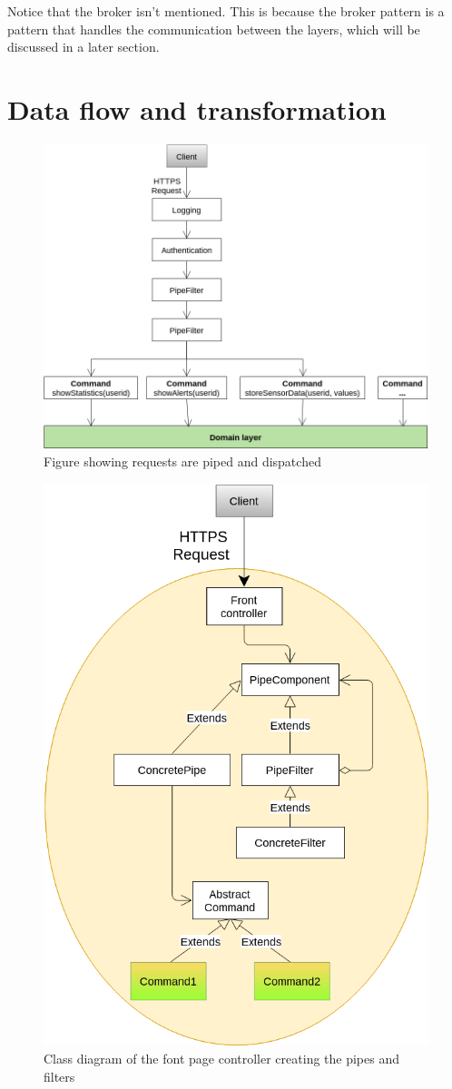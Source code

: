 Notice that the broker isn't mentioned. This is because the broker pattern is a pattern that handles the communication between the layers, which will be discussed in a later section.

\clearpage
\section{Data flow and transformation}

\begin{figure}[H]
\centering
\includegraphics[width=0.8\linewidth]{7-software/images/FrontFlow.png}
\caption{Figure showing requests are piped and dispatched}
\label{fig:frontflow}
\end{figure}

\begin{figure}[H]
\centering
\includegraphics[width=0.5\linewidth]{7-software/images/FrontClasses.png}
\caption{Class diagram of the font page controller creating the pipes and filters}
\label{fig:frontclasses}
\end{figure}

